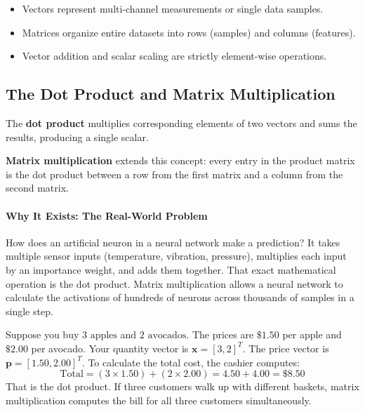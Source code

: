 \begin{takeaways}
\begin{itemize}
    \item Vectors represent multi-channel measurements or single data samples.
    \item Matrices organize entire datasets into rows (samples) and columns (features).
    \item Vector addition and scalar scaling are strictly element-wise operations.
\end{itemize}
\end{takeaways}

\subsection{The Dot Product and Matrix Multiplication}

\begin{keyidea}
The \textbf{dot product} multiplies corresponding elements of two vectors and sums the results, producing a single scalar.

\textbf{Matrix multiplication} extends this concept: every entry in the product matrix is the dot product between a row from the first matrix and a column from the second matrix.
\end{keyidea}

\paragraph{Why It Exists: The Real-World Problem}
How does an artificial neuron in a neural network make a prediction? It takes multiple sensor inputs (temperature, vibration, pressure), multiplies each input by an importance weight, and adds them together. That exact mathematical operation is the dot product. Matrix multiplication allows a neural network to calculate the activations of hundreds of neurons across thousands of samples in a single step.

\begin{analogy}
Suppose you buy $3\text{ apples}$ and $2\text{ avocados}$. The prices are $\$1.50$ per apple and $\$2.00$ per avocado. 
Your quantity vector is $\mathbf{x} = [3, 2]^T$. The price vector is $\mathbf{p} = [1.50, 2.00]^T$.
To calculate the total cost, the cashier computes:
\begin{equation*}
\text{Total} = (3 \times 1.50) + (2 \times 2.00) = 4.50 + 4.00 = \$8.50
\end{equation*}
That is the dot product. If three customers walk up with different baskets, matrix multiplication computes the bill for all three customers simultaneously.
\end{analogy}

